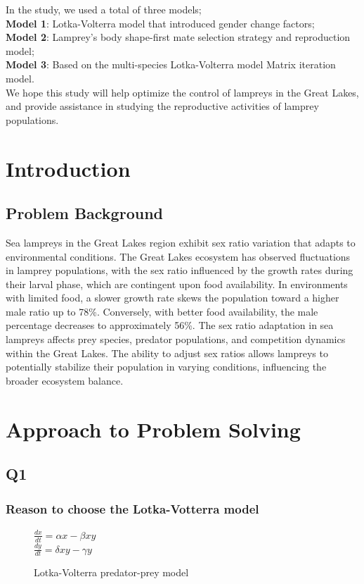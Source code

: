 \documentclass[12pt]{article}
\begin{document}
In the study, we used a total of three models; \\
\textbf{Model 1}: Lotka-Volterra model that introduced gender change factors;\\
\textbf{Model 2}: Lamprey's body shape-first mate selection strategy and reproduction model;\\
\textbf{Model 3}: Based on the multi-species Lotka-Volterra model Matrix iteration model. \\We hope this study will help optimize the control of lampreys in the Great Lakes, and provide assistance in studying the reproductive activities of lamprey populations.
\newpage
\tableofcontents
\newpage
\clearpage
\pagestyle{fancy}
\newpage
\setcounter{page}{1}


\section{Introduction}
\subsection{Problem Background}
Sea lampreys in the Great Lakes region exhibit sex ratio variation that adapts to environmental conditions.
The Great Lakes ecosystem has observed fluctuations in lamprey populations, with the sex ratio influenced by
the growth rates during their larval phase, which are contingent upon food availability. In environments with
limited food, a slower growth rate skews the population toward a higher male ratio up to 78\%. Conversely, with
better food availability, the male percentage decreases to approximately 56\%. The sex ratio adaptation in sea
lampreys affects prey species, predator populations, and competition dynamics within the Great Lakes. The ability
to adjust sex ratios allows lampreys to potentially stabilize their population in varying conditions, influencing
the broader ecosystem balance.
\section{Approach to Problem Solving}
\subsection{Q1}
\subsubsection*{Reason to choose the Lotka-Votterra model}
\begin{figure}[h]
	\large
	\centering
	$\frac{dx}{dt}=\alpha x - \beta xy$ \\
	$\frac{dy}{dt}=\delta xy - \gamma y$
	\caption*{Lotka-Volterra predator-prey model}
\end{figure}
\end{document}
